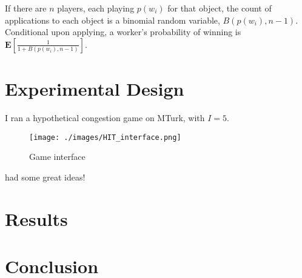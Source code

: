 \documentclass[11pt]{article}
\begin{document}
If there are $n$ players, each playing $p(w_i)$ for that object, the count of applications to each object is a binomial random variable, $B(p(w_i), n - 1)$.
Conditional upon applying, a worker's probability of winning is $\mathbf{E}[\frac{1}{1 + B(p(w_i), n - 1)}]$.  

\section{Experimental Design} 
I ran a hypothetical congestion game on MTurk, with $I = 5$. 

\begin{figure} 
\centering 
\caption{Game interface} 
\begin{minipage}{0.85 \linewidth}
\texttt{[image: ./images/HIT\_interface.png]}
\end{minipage} 
\end{figure}  

\cite{smith1999wealth} had some great ideas! 


\section{Results} 

\section{Conclusion} 




\end{document}
